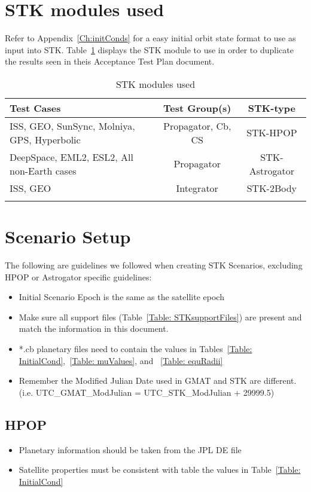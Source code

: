 \section{STK modules used}
Refer to Appendix~\ref{Ch:initConds} for a easy initial orbit state
format to use as input into STK. Table~\ref{Table: STKinitStates}
displays the STK module to use in order to duplicate the results
seen in theis Acceptance Test Plan document.

\begin{table}[htb]
\centering \caption{STK modules used}
    \begin{tabular}{lcc}
    \hline\hline
        Test Cases & Test Group(s) & STK-type\\
        \hline
        ISS, GEO, SunSync, Molniya, GPS, Hyperbolic & Propagator, Cb, CS  & STK-HPOP\\
        DeepSpace, EML2, ESL2, All non-Earth cases & Propagator & STK-Astrogator\\
        ISS, GEO & Integrator & STK-2Body\\
        \hline\hline
      \label{Table: STKinitStates}
\end{tabular}
\end{table}

\section{Scenario Setup}
The following are guidelines we followed when creating STK
Scenarios, excluding HPOP or Astrogator specific guidelines:
\begin{itemize}
  \item Initial Scenario Epoch is the same as the satellite epoch
  \item Make sure all support files (Table~\ref{Table: STKsupportFiles})
  are present and match the information in this document.
  \item *.cb planetary files need to contain the values in
  Tables~\ref{Table: InitialCond},~\ref{Table: muValues}, and ~\ref{Table: equRadii}
  \item Remember the Modified Julian Date used in GMAT and STK are
  different.\\
  (i.e. UTC\_GMAT\_ModJulian = UTC\_STK\_ModJulian + 29999.5)
\end{itemize}

\subsection{HPOP}
\begin{itemize}
  \item Planetary information should be taken from the JPL DE file
  \item Satellite properties must be consistent with table the values
  in Table~\ref{Table: InitialCond}
\end{itemize}

